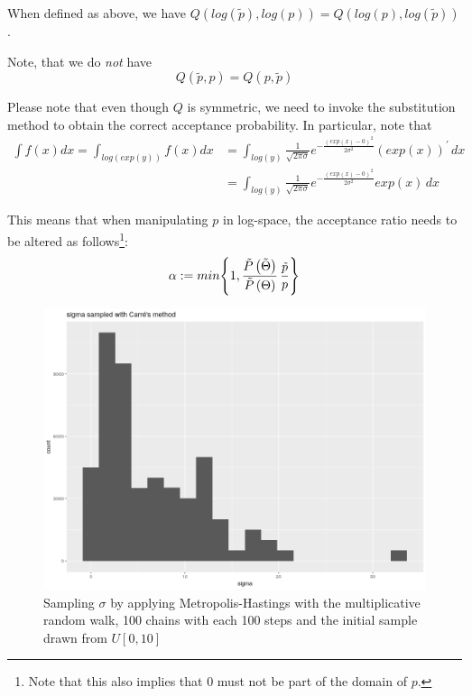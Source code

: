 \begin{lemma}
	When defined as above, we have $Q\left(log(\tilde{p}), log(p)\right) = Q\left( log(p), log(\tilde{p})\right)$.
	
	Note, that we do \textit{not} have
	\[
	Q\left(\tilde{p}, p\right) = Q\left( p , \tilde{p}\right)
	\]
\end{lemma}

	 Please note that even though $Q$ is symmetric, we need to invoke the substitution method to obtain the correct acceptance probability. 
	 In particular, note that 
	 \begin{align*}
	 	\int f(x) dx = \int_{log(exp(y))} f(x) dx &= 
	 	\int_{log(y)} \frac{1}{\sqrt{2 \pi \sigma}} e^{- \frac{ \left(exp(x) - 0\right)^2}{2 \sigma^2}} \left(exp(x)\right)^{\prime}  \, dx\\
	 	&= \int_{log(y)} \frac{1}{\sqrt{2 \pi \sigma}} e^{- \frac{ \left(exp(x) - 0\right)^2}{2 \sigma^2}} exp(x) \, dx
	 \end{align*} 
	 
	 This means that when manipulating $p$ in log-space, the acceptance ratio needs to be altered as follows\footnote{Note that this also implies that $0$ must not be part of the domain of $p$. }:
	 \[
	 	\alpha := min \Bigg\{ 
	 		1, \frac{\tilde{P}\left(\tilde{\Theta}\right)}{\tilde{P}\left(\Theta\right)} \, \frac{\tilde{p}}{p}
	 		\Bigg\}
	 \]
	 
	 \begin{figure}
	 	\includegraphics[height=0.3\textheight]{img/carre_sigma_biased.png}
	 	\caption{Sampling $\sigma$ by applying Metropolis-Hastings with the multiplicative random walk, 100 chains with each 100 steps and the initial sample drawn from $U[0, 10]$}
	 	\label{fig:carre_sigma_not_uniform}
	 \end{figure}
	 
